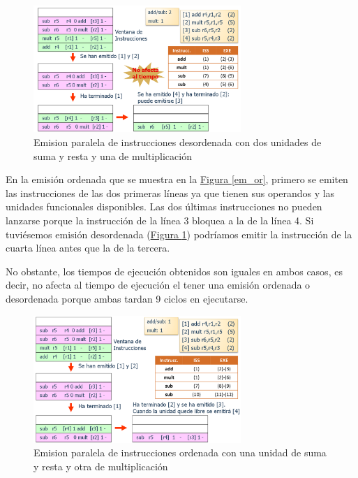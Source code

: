 \documentclass[10pt,a4paper,spanish]{report}
\begin{document}
\begin{figure}[!h]
\centering
\includegraphics[width=0.7\textwidth]{87}
\caption{Emision paralela de instrucciones desordenada con dos unidades de suma y resta y una de multiplicación}
\label{em_dor}
\end{figure}

En la emisión ordenada que se muestra en la \hyperref[em_or]{Figura \ref*{em_or}}, primero se emiten las instrucciones de las dos primeras líneas ya que tienen sus operandos y las unidades funcionales disponibles. Las dos últimas instrucciones no pueden lanzarse porque la instrucción de la línea 3 bloquea a la de la línea 4. Si tuviésemos emisión desordenada (\hyperref[em_dor]{Figura \ref*{em_dor}}) podríamos emitir la instrucción de la cuarta línea antes que la de la tercera.

No obstante, los tiempos de ejecución obtenidos son iguales en ambos casos, es decir, no afecta al tiempo de ejecución el tener una emisión ordenada o desordenada porque ambas tardan 9 ciclos en ejecutarse.

\begin{figure}[!h]
\centering
\includegraphics[width=0.7\textwidth]{88}
\caption{Emision paralela de instrucciones ordenada con una unidad de suma y resta y otra de multiplicación}
\label{em_or_una}
\end{figure}
\end{document}
